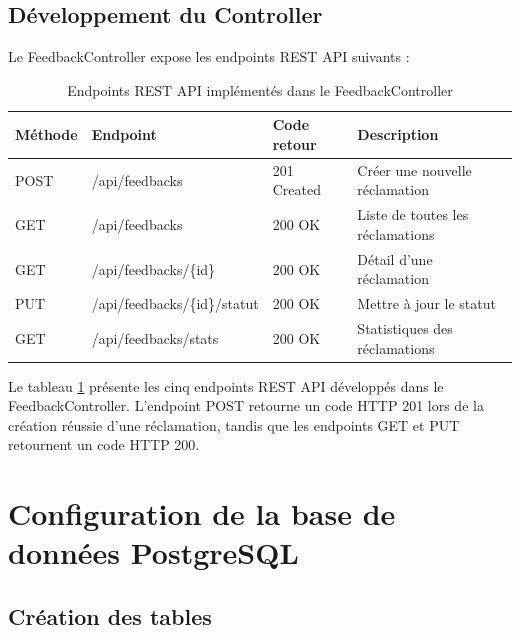 \subsection{Développement du Controller}
Le FeedbackController expose les endpoints REST API suivants :

\begin{table}[H]
\centering
\caption{Endpoints REST API implémentés dans le FeedbackController}
\label{tab:endpoints}
\renewcommand{\arraystretch}{1.8}
\begin{tabular}{|p{1.8cm}|p{5cm}|p{2cm}|p{4cm}|}
\hline
\textbf{Méthode} & \textbf{Endpoint} & \textbf{Code retour} & 
\textbf{Description} \\
\hline
POST & /api/feedbacks & 201 Created & Créer une nouvelle réclamation \\
\hline
GET & /api/feedbacks & 200 OK & Liste de toutes les réclamations \\
\hline
GET & /api/feedbacks/\{id\} & 200 OK & Détail d'une réclamation \\
\hline
PUT & /api/feedbacks/\{id\}/statut & 200 OK & Mettre à jour le statut \\
\hline
GET & /api/feedbacks/stats & 200 OK & Statistiques des réclamations \\
\hline
\end{tabular}
\end{table}

Le tableau \ref{tab:endpoints} présente les cinq endpoints REST API 
développés dans le FeedbackController. L'endpoint POST retourne un 
code HTTP 201 lors de la création réussie d'une réclamation, tandis que 
les endpoints GET et PUT retournent un code HTTP 200.

\section{Configuration de la base de données PostgreSQL}

\subsection{Création des tables}

